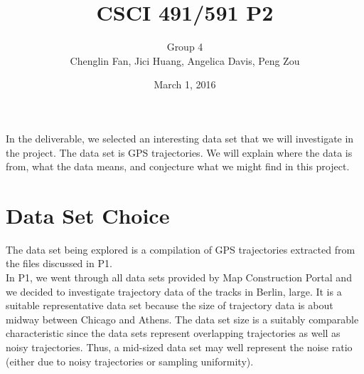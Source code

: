 \documentclass[11pt]{article}
\title{CSCI 491/591 P2}
\date{March 1, 2016}
\author{Group 4\\Chenglin Fan, Jici Huang,
Angelica Davis, Peng Zou}
\begin{document}
\maketitle
\noindent
In the deliverable, we selected an interesting data set
that we will investigate in the project.  The data set is GPS trajectories. We will explain where the data is
from,  what  the  data  means,  and  conjecture  what  we  might  find  in  this
project.
\section*{Data Set Choice}
The data set being explored is a compilation of GPS trajectories extracted from the files discussed in P1. \\
In P1, we went through all data sets provided by Map Construction Portal and we decided to investigate trajectory data of the tracks in Berlin, large. It is a suitable representative data set because the size of trajectory data is about midway between Chicago and Athens. The data set size is a suitably comparable characteristic since the data sets represent overlapping trajectories as well as noisy trajectories. Thus, a mid-sized data set may well represent the noise ratio (either due to noisy trajectories or sampling uniformity).
\end{document}
